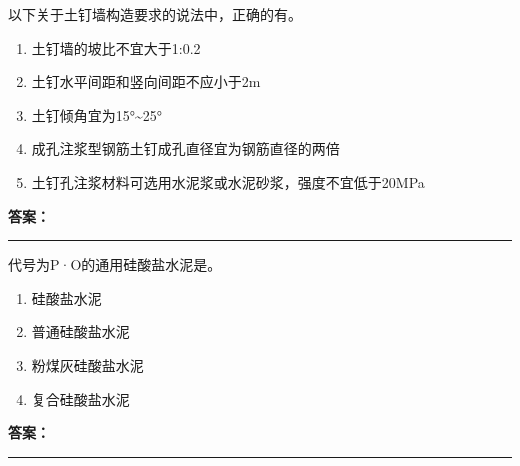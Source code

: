 \documentclass[UTF8,fontset=fandol,11pt]{ctexart}
\newcommand{\answerline}{\textcolor{answerred}{\rule{2.4cm}{0.7pt}}}
\begin{document}
\begin{quizbox}[title={乱序第 135 题｜第三章基坑工程}]

以下关于土钉墙构造要求的说法中，正确的有。\\

\begin{enumerate}[label=\Alph*.]

\item 土钉墙的坡比不宜大于1:0.2

\item 土钉水平间距和竖向间距不应小于2m

\item 土钉倾角宜为15°\textasciitilde{}25°

\item 成孔注浆型钢筋土钉成孔直径宜为钢筋直径的两倍

\item 土钉孔注浆材料可选用水泥浆或水泥砂浆，强度不宜低于20MPa

\end{enumerate}

\textbf{\textcolor{answerred}{答案：}} \answerline

\end{quizbox}

\vspace{0.2em}

\begin{quizbox}[title={乱序第 136 题｜第四章混凝土结构工程}]

代号为P·O的通用硅酸盐水泥是。\\

\begin{enumerate}[label=\Alph*.]

\item 硅酸盐水泥

\item 普通硅酸盐水泥

\item 粉煤灰硅酸盐水泥

\item 复合硅酸盐水泥

\end{enumerate}

\textbf{\textcolor{answerred}{答案：}} \answerline

\end{quizbox}

\vspace{0.2em}
\end{document}
